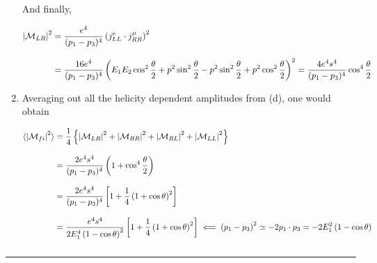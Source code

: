 \begin{solution}
\begin{enumerate}[label=(\alph*)]
        And finally, 

            \begin{align*}
                \left|\mathcal{M}_{LR}\right|^2 &= \frac{e^4}{(p_1-p_3)^4} \left(j^e_{LL}\cdot j^\mu_{RR}\right)^2  \\[0.125in] 
                &= \frac{16e^4}{(p_1-p_3)^4} \left( E_1E_2\cos^2\frac{\theta}{2} + p^2 \sin^2\frac{\theta}{2} - p^2 \sin^2\frac{\theta}{2} + p^2 \cos^2\frac{\theta}{2} \right)^2 = \frac{4e^4s^4}{(p_1-p_3)^4}  \cos^4\frac{\theta}{2} \\
            \end{align*}

        \item Averaging out all the helicity dependent amplitudes from (d), one would obtain 
        
            \begin{align*}
                \langle \left|\mathcal{M}_{fi}\right|^2 \rangle &= \frac{1}{4} \left\{ \left|\mathcal{M}_{LR}\right|^2 + \left|\mathcal{M}_{RR}\right|^2  + \left|\mathcal{M}_{RL}\right|^2  + \left|\mathcal{M}_{LL}\right|^2  \right\} \\[0.12in]
                &= \frac{2e^4s^4}{(p_1-p_3)^4} \left( 1+ \cos^4\frac{\theta}{2} \right) \\[0.12in]
                &= \frac{2e^4s^4}{(p_1-p_3)^4} \left[ 1+ \frac{1}{4}\left(1+\cos\theta\right)^2 \right] \\[0.12in]
                &= \frac{e^4s^4}{2E_1^4 \left( 1-\cos\theta\right)^2} \left[ 1+ \frac{1}{4}\left(1+\cos\theta\right)^2 \right] \impliedby \left(p_1-p_3\right)^2 \simeq -2p_1\cdot p_3 = -2 E_1^2 \left(1-\cos\theta \right)\\[0.12in]
            \end{align*}
    \end{enumerate}
\end{solution}

\noindent\rule{7in}{1.5pt}


